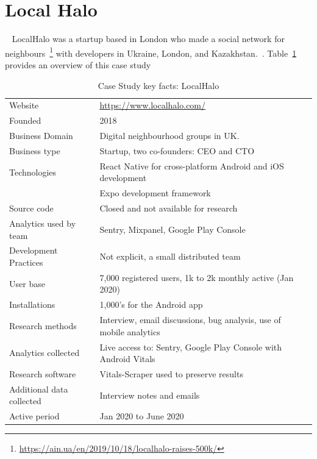 \section{Local Halo}~\label{study-localhalo}
LocalHalo was a startup based in London who made a social network for neighbours~\footnote{\url{https://ain.ua/en/2019/10/18/localhalo-raises-500k/}} with developers in Ukraine, London, and Kazakhstan.~\citep{karpenko2019_localhalo_a_social_network_for_neighbors}. 
Table~\ref{tab:local_halo_anaytics_overview} provides an overview of this case study

{\renewcommand{\arraystretch}{0.8}%
\begin{table}[htbp!]
    \centering
    \small
    \setlength{\tabcolsep}{1pt}
    \begin{tabular}{ll}
       \toprule
       Website &\url{https://www.localhalo.com/} \\
       Founded &2018 \\
       Business Domain &Digital neighbourhood groups in UK.\\
       Business type &Startup, two co-founders: CEO and CTO \\
       Technologies  &React Native for cross-platform Android and iOS development \\
       &Expo development framework \\
       Source code  &Closed and not available for research \\
       Analytics used by team &Sentry, Mixpanel, Google Play Console \\
       Development Practices &Not explicit, a small distributed team \\
       \midrule
       User base &7,000 registered users, 1k to 2k monthly active (Jan 2020) \\
       Installations &1,000's for the Android app \\
       \midrule
       Research methods &Interview, email discussions, bug analysis, use of mobile analytics \\
       Analytics collected &Live access to: Sentry, Google Play Console with Android Vitals \\
       Research software &Vitals-Scraper used to preserve results \\
       Additional data collected &Interview notes and emails \\
       Active period &Jan 2020 to June 2020 \\
       \bottomrule
    \end{tabular}
    \caption{Case Study key facts: LocalHalo}
    \label{tab:local_halo_anaytics_overview}
\end{table}
}

